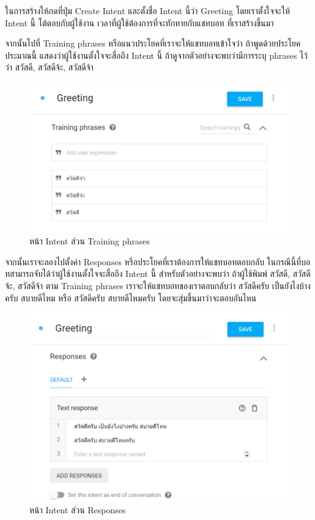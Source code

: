 \begin{enumerate}
	ในการสร้างให้กดที่ปุ่ม Create Intent และตั้งชื่อ Intent นี้ว่า Greeting โดยเราตั้งใจจะให้ Intent นี้ โต้ตอบกับผู้ใช้งาน เวลาที่ผู้ใช้ต้องการที่จะทักทายกับแชทบอท ที่เราสร้างขึ้นมา

	จากนั้นไปที่ Training phrases หรือแนวประโยคที่เราจะให้แชทบอทเข้าใจว่า ถ้าพูดด้วยประโยคประมาณนี้ แสดงว่าผู้ใช้งานตั้งใจจะสื่อถึง Intent นี้ ถ้าดูจากตัวอย่างจะพบว่ามีการระบุ phrases ไว้ว่า สวัสดี, สวัสดีจ้ะ, สวัสดีจ้า

	\begin{figure}[H]
		\centering
		\includegraphics[width=0.7\columnwidth]{Figures/2/dialogflow_3}
		\caption{หน้า Intent ส่วน Training phrases}
		\label{Fig:f1}
	\end{figure}
	
	จากนั้นเราจะลองไปตั้งค่า Responses หรือประโยคที่เราต้องการให้แชทบอทตอบกลับ ในกรณีนี้ที่บอทสามารถจับได้ว่าผู้ใช้งานตั้งใจจะสื่อถึง Intent นี้ สำหรับตัวอย่างจะพบว่า ถ้าผู้ใช้พิมพ์ สวัสดี, สวัสดีจ้ะ, สวัสดีจ้า ตาม Training phrases เราจะให้แชทบอทของเราตอบกลับว่า สวัสดีครับ เป็นยังไงบ้างครับ สบายดีไหม หรือ สวัสดีครับ สบายดีไหมครับ โดยจะสุ่มขึ้นมาว่าจะตอบอันไหน
	
	\begin{figure}[H]
		\centering
		\includegraphics[width=0.7\columnwidth]{Figures/2/dialogflow_4}
		\caption{หน้า Intent ส่วน Responses}
		\label{Fig:f1}
	\end{figure}


\end{enumerate}
